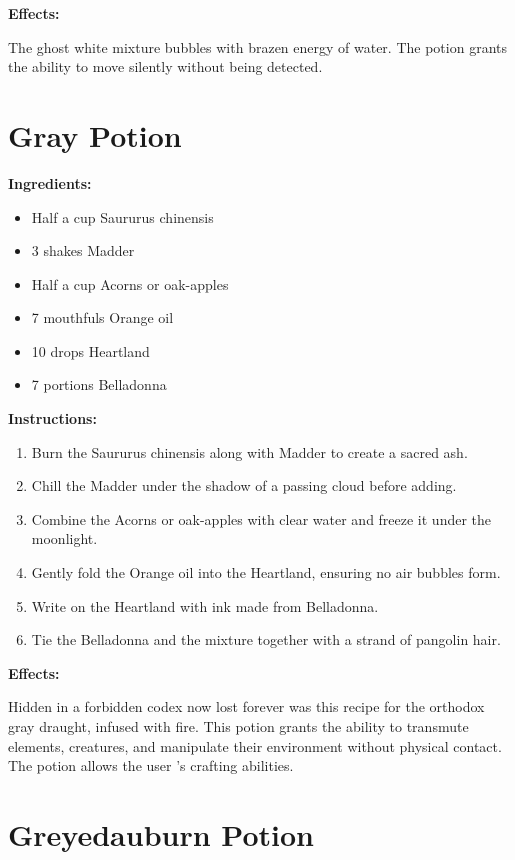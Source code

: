 \documentclass{article}
\begin{document}
\textbf{Effects:}

The ghost white mixture bubbles with brazen energy of water. The potion grants the ability to move silently without being detected.

\newpage
\section*{Gray Potion}

\textbf{Ingredients:}

\begin{itemize}
  \item Half a cup Saururus chinensis
  \item 3 shakes Madder
  \item Half a cup Acorns or oak-apples
  \item 7 mouthfuls Orange oil
  \item 10 drops Heartland
  \item 7 portions Belladonna
\end{itemize}

\textbf{Instructions:}

\begin{enumerate}
  \item Burn the Saururus chinensis along with Madder to create a sacred ash.
  \item Chill the Madder under the shadow of a passing cloud before adding.
  \item Combine the Acorns or oak-apples with clear water and freeze it under the moonlight.
  \item Gently fold the Orange oil into the Heartland, ensuring no air bubbles form.
  \item Write on the Heartland with ink made from Belladonna.
  \item Tie the Belladonna and the mixture together with a strand of pangolin hair.
\end{enumerate}

\textbf{Effects:}

Hidden in a forbidden codex now lost forever was this recipe for the orthodox gray draught, infused with fire. This potion grants the ability to transmute elements, creatures, and manipulate their environment without physical contact. The potion allows the user 's crafting abilities.

\newpage
\section*{Greyedauburn Potion}
\end{document}
